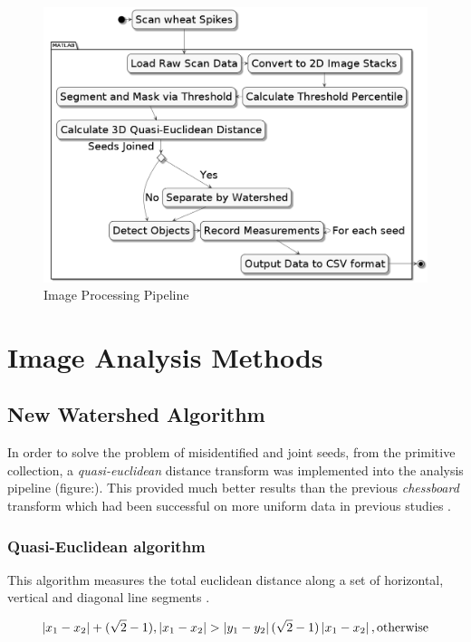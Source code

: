 \documentclass[11pt]{report}
\begin{document}
\begin{figure}[htbp]
\centering
\includegraphics[width=13cm]{./images/matlab.png}
\caption{\label{fig:org4b2937e}
Image Processing Pipeline}
\end{figure}

\section{Image Analysis Methods}
\label{sec:orgde44dd4}
\subsection{New Watershed Algorithm}
\label{sec:org942e1e5}

In order to solve the problem of misidentified and joint seeds, from the primitive collection,
a  \emph{quasi-euclidean} distance transform was implemented into the analysis pipeline (figure:). This provided much better results than the previous
\emph{chessboard} transform which had been successful on more uniform data in previous studies \cite{Hughes2017}.

\subsubsection{Quasi-Euclidean algorithm}
\label{sec:org08de61a}

This algorithm measures the total euclidean distance along a set of horizontal, vertical and diagonal
line segments \cite{Pfaltz1966}.

\begin{equation}
\label{eq:org9db96d6}
\left | x_1 - x_2 \right | + (\sqrt{2}-1), \left | x_1 - x_2 \right | >\left | y_1 - y_2 \right | (\sqrt{2}-1) \left | x_1 - x_2 \right | ,\textup{otherwise}
\end{equation}
\end{document}
